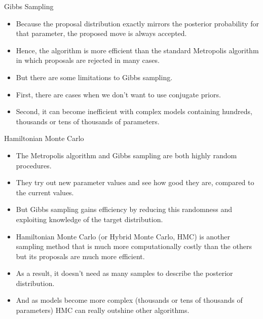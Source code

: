 \documentclass[handout]{beamer}
\begin{document}
\begin{frame}{Gibbs Sampling}
\scriptsize{

\begin{itemize}

\item Because the proposal distribution exactly mirrors the posterior probability for that parameter, the proposed move is always accepted.

\item Hence, the algorithm is more efficient than the standard Metropolis algorithm in which proposals are rejected in many cases.

\item But there are some limitations to Gibbs sampling.

\item First, there are cases when we don't want to use conjugate priors. 

\item Second, it can become inefficient with complex models containing hundreds, thousands or tens of thousands of parameters.


\end{itemize}


} 
\end{frame}



\begin{frame}{Hamiltonian Monte Carlo}
\scriptsize{

\begin{itemize}
\item The Metropolis algorithm and Gibbs sampling are both highly random procedures.
\item They try out new parameter values and see how good they are, compared to the current values.
\item But Gibbs sampling gains efficiency by reducing this randomness and exploiting knowledge of the target distribution. 

\item Hamiltonian Monte Carlo (or Hybrid Monte Carlo, HMC) is another sampling method that is much more computationally costly than the others but its proposals are much more efficient.

\item As a result, it doesn't need as many samples to describe the posterior distribution. 
\item And as models become more complex (thousands or tens of thousands of parameters) HMC can really outshine other algorithms.

\end{itemize}


} 
\end{frame}
\end{document}
